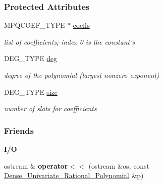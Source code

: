 \subsubsection*{Protected Attributes}
\begin{DoxyCompactItemize}
\item 
\mbox{\label{group__polygroup_a6137f99c673dcbf4dadab7dedca067a9}} 
M\+P\+Q\+C\+O\+E\+F\+\_\+\+T\+Y\+PE $\ast$ \hyperlink{group__polygroup_a6137f99c673dcbf4dadab7dedca067a9}{coeffs}
\begin{DoxyCompactList}\small\item\em list of coefficients; index 0 is the constant's \end{DoxyCompactList}\item 
\mbox{\label{group__polygroup_a1c6da3f7245cd50ec18c5877202fd8f6}} 
D\+E\+G\+\_\+\+T\+Y\+PE \hyperlink{group__polygroup_a1c6da3f7245cd50ec18c5877202fd8f6}{deg}
\begin{DoxyCompactList}\small\item\em degree of the polynomial (largest nonzero exponent) \end{DoxyCompactList}\item 
\mbox{\label{group__polygroup_ac1150612197de4b6cb20463fd0c33134}} 
D\+E\+G\+\_\+\+T\+Y\+PE \hyperlink{group__polygroup_ac1150612197de4b6cb20463fd0c33134}{size}
\begin{DoxyCompactList}\small\item\em number of slots for coefficients \end{DoxyCompactList}\end{DoxyCompactItemize}
\subsubsection*{Friends}
\begin{Indent}\textbf{ I/O}\par
\begin{DoxyCompactItemize}
\item 
\mbox{\label{group__polygroup_ac7750eb75a7943bbc34c104cd36333ff}} 
ostream \& {\bfseries operator$<$$<$} (ostream \&os, const \hyperlink{group__polygroup_class_dense___univariate___rational___polynomial}{Dense\+\_\+\+Univariate\+\_\+\+Rational\+\_\+\+Polynomial} \&p)
\end{DoxyCompactItemize}
\end{Indent}


